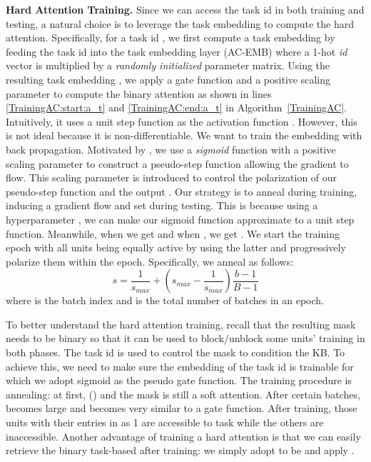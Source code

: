 \documentclass[runningheads]{llncs}
\begin{document}
\vspace{+4mm}
\noindent
\textbf{Hard Attention Training.} Since we can access the task id in both training and testing, a natural choice is to leverage the task embedding to compute the hard attention. Specifically, for a task id , we first compute a task embedding  by feeding the task id into the task embedding layer (AC-EMB) where a 1-hot {\em id} vector is multiplied by a {\em randomly initialized} parameter matrix. Using the resulting task embedding , we apply a gate function  and a positive scaling parameter  to compute the binary attention  as shown in lines \ref{TrainingAC:start:a_t} and \ref{TrainingAC:end:a_t} in Algorithm~\ref{TrainingAC}. Intuitively, it uses a unit step function as the activation function . However, this is not ideal because it is non-differentiable. We want to train the embedding  with back propagation. Motivated by \cite{DBLP:conf/icml/SerraSMK18}, we use a {\em sigmoid} function with a positive scaling parameter  to construct a pseudo-step function allowing the gradient to flow. This scaling parameter is introduced to control the polarization of our pseudo-step function and the output . Our strategy is to anneal  during training, inducing a gradient flow and set  during testing. This is because using a {\color{black}hyperparameter} , we can make our sigmoid function approximate to a unit step function. Meanwhile, when  we get  and when , we get . We start the training epoch with all units being equally active by using the latter and progressively polarize them within the epoch. Specifically, we anneal  as follows:
\begin{dmath}
s = \frac{1}{s_{max}} + (s_{max} - \frac{1}{s_{max}})\frac{b-1}{B-1}
\label{eq:anneals}
\end{dmath}
where {\color{black}} is the batch index and  is the total number of batches in an epoch.

To better understand the hard attention training, recall that the resulting mask  needs to be binary so that it can be used to block/unblock some units' training in both phases. The task id is used to control the mask to condition the KB. To achieve this, we need to make sure the embedding of the task id is trainable for which we adopt sigmoid as the pseudo gate function. The training procedure is annealing: at first, {\color{black} ()} and the mask is still a soft attention. After certain batches,  becomes large and   becomes very similar to a gate function. After training, those units with their entries in  as 1 are accessible to task  while the others are inaccessible. Another advantage of training a hard attention is that we can easily retrieve the binary task-based  after training: we simply adopt  to be  and apply .
\end{document}

